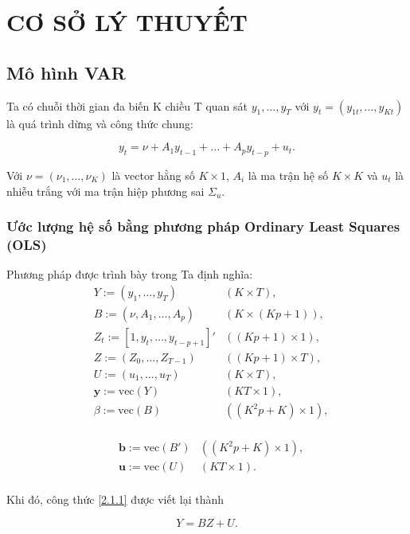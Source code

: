 \chapter{CƠ SỞ LÝ THUYẾT}
\section{Mô hình VAR}

Ta có chuỗi thời gian đa biến K chiều T quan sát $y_1,\dots,y_T$ với $y_t = (y_{1t}, \dots, y_{Kt})$ là quá trình dừng và công thức chung:

\begin{equation}
    y_t = \nu + A_1 y_{t-1} + \dots + A_p y_{t-p} + u_t. \label{2.1.1}
\end{equation}

Với $\nu = (\nu_1, \dots, \nu_K)$ là vector hằng số $K \times 1$, $A_i$ là ma trận hệ số $K \times K$ và $u_t$ là nhiễu trắng với ma trận hiệp phương sai $\Sigma_u$.

\subsection{Ước lượng hệ số bằng phương pháp Ordinary Least Squares (OLS)}
Phương pháp được trình bày trong \cite{HELMUT2005}
Ta định nghĩa:
\begin{align*}
    & Y := (y_1, \dots, y_T) & (K \times T), \\    
    & B := (\nu, A_1, \dots, A_p) & (K \times (Kp + 1)), \\   
    & Z_t := [1, y_t, \dots, y_{t-p+1}]' &  ((Kp + 1) \times 1), \\
    & Z := (Z_0, \dots, Z_{T-1}) & ((Kp + 1) \times T), \\
    & U := (u_1,\dots, u_T) & (K \times T), \\
    & \textbf{y} := \text{vec}(Y) & (KT \times 1), \\
    & \beta := \text{vec}(B) & ((K^2p+K) \times 1), \\
\end{align*}

\begin{align*}
       & \textbf{b} := \text{vec}(B') & ((K^2p+K) \times 1), \\
    & \textbf{u} := \text{vec}(U) & (KT \times 1). \\
\end{align*}

Khi đó, công thức \ref{2.1.1} được viết lại thành

\begin{equation}
    Y = BZ + U.
\end{equation}

